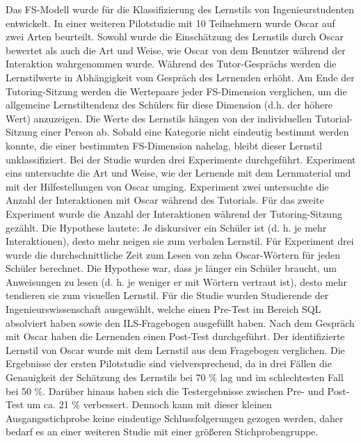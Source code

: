         Das FS-Modell wurde für die Klassifizierung des Lernstils von Ingenieurstudenten entwickelt.
        In einer weiteren Pilotstudie mit 10 Teilnehmern wurde Oscar auf zwei Arten beurteilt.
        Sowohl wurde die Einschätzung des Lernstils durch Oscar bewertet als auch die Art und Weise, wie Oscar von dem Benutzer 
        während der Interaktion wahrgenommen wurde.
        Während des Tutor-Gesprächs werden die Lernstilwerte in Abhängigkeit vom Gespräch des Lernenden erhöht.
        Am Ende der Tutoring-Sitzung werden die Wertepaare jeder FS-Dimension verglichen, um die allgemeine Lernstiltendenz 
        des Schülers für diese Dimension (d.h. der höhere Wert) anzuzeigen. Die Werte des Lernstils hängen von der individuellen
        Tutorial-Sitzung einer Person ab. Sobald eine Kategorie nicht eindeutig bestimmt werden konnte, die einer bestimmten FS-Dimension nahelag,
        bleibt dieser Lernstil unklassifiziert. 
        Bei der Studie wurden drei Experimente durchgeführt.
        Experiment eins untersuchte die Art und Weise, wie der Lernende mit dem Lernmaterial und mit der Hilfestellungen von Oscar umging.  
        Experiment zwei untersuchte die Anzahl der Interaktionen mit Oscar während des Tutorials.
        Für das zweite Experiment wurde die Anzahl der Interaktionen während der Tutoring-Sitzung gezählt. 
        Die Hypothese lautete: \glqq Je diskursiver ein Schüler 
        ist (d. h. je mehr Interaktionen), desto mehr neigen sie zum verbalen Lernstil\grqq{}.
        Für Experiment drei wurde die 
        durchschnittliche Zeit zum Lesen von zehn Oscar-Wörtern für jeden Schüler berechnet.
        Die Hypothese war, dass \glqq je länger ein Schüler braucht, um Anweisungen zu lesen 
        (d. h. je weniger er mit Wörtern vertraut ist), desto mehr tendieren sie zum visuellen Lernstil\grqq{}. 
        Für die Studie wurden Studierende der Ingenieurswissenschaft ausgewählt, welche einen Pre-Test im Bereich SQL absolviert haben sowie den ILS-Fragebogen ausgefüllt haben.
        Nach dem Gespräch mit Oscar haben die Lernenden einen Post-Test durchgeführt. Der identifizierte Lernstil von Oscar 
        wurde mit dem Lernstil aus dem Fragebogen verglichen.
        Die Ergebnisse der ersten Pilotstudie sind vielversprechend, da in drei Fällen die Genauigkeit der Schätzung des Lernstils bei 70 \% lag und im schlechtesten Fall bei 50 \%.
        Darüber hinaus haben sich die 
        Testergebnisse zwischen Pre- und Post-Test um ca. 21 \% verbessert. Dennoch kann mit dieser kleinen Ausgangsstichprobe keine 
        eindeutige Schlussfolgerungen gezogen werden, daher bedarf es an einer weiteren Studie mit einer größeren Stichprobengruppe. \parencite[6 f.]{Oscar}

